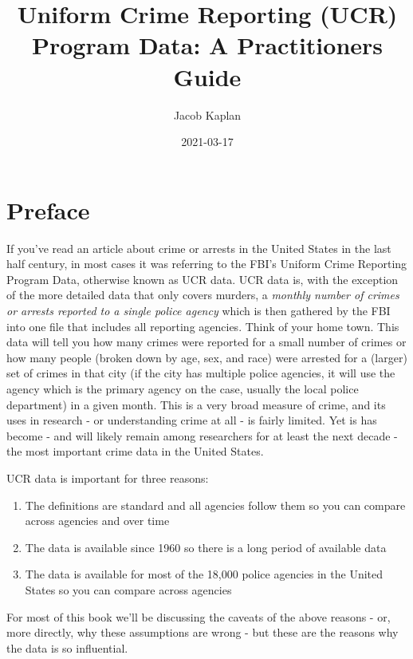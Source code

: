 \documentclass[
  12pt,
  openany]{book}
\title{Uniform Crime Reporting (UCR) Program Data: A Practitioners Guide}
\author{Jacob Kaplan}
\date{2021-03-17}
\providecommand{\tightlist}{%
  \setlength{\itemsep}{0pt}\setlength{\parskip}{0pt}}
\begin{document}
\maketitle

{
\hypersetup{linkcolor=}
\setcounter{tocdepth}{2}
\tableofcontents
}
\hypertarget{preface}{%
\chapter*{Preface}\label{preface}}


If you've read an article about crime or arrests in the United States in the last half century, in most cases it was referring to the FBI's Uniform Crime Reporting Program Data, otherwise known as UCR data. UCR data is, with the exception of the more detailed data that only covers murders, a \emph{monthly number of crimes or arrests reported to a single police agency} which is then gathered by the FBI into one file that includes all reporting agencies. Think of your home town. This data will tell you how many crimes were reported for a small number of crimes or how many people (broken down by age, sex, and race) were arrested for a (larger) set of crimes in that city (if the city has multiple police agencies, it will use the agency which is the primary agency on the case, usually the local police department) in a given month. This is a very broad measure of crime, and its uses in research - or understanding crime at all - is fairly limited. Yet is has become - and will likely remain among researchers for at least the next decade - the most important crime data in the United States.

UCR data is important for three reasons:

\begin{enumerate}
\def\labelenumi{\arabic{enumi}.}
\tightlist
\item
  The definitions are standard and all agencies follow them so you can compare across agencies and over time
\item
  The data is available since 1960 so there is a long period of available data
\item
  The data is available for most of the 18,000 police agencies in the United States so you can compare across agencies
\end{enumerate}

For most of this book we'll be discussing the caveats of the above reasons - or, more directly, why these assumptions are wrong - but these are the reasons why the data is so influential.
\end{document}
